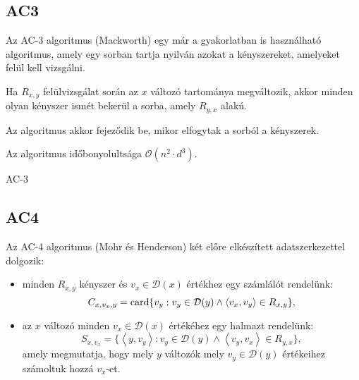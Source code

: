 \subsection{AC3}

Az AC-3 algoritmus (Mackworth) egy már a gyakorlatban is használható
algoritmus, amely egy sorban tartja nyilván azokat a kényszereket, amelyeket
felül kell vizsgálni.

Ha $R_{x,y}$ felülvizsgálat során az  $x$ változó tartománya megváltozik, akkor
minden olyan kényszer ismét bekerül a sorba, amely $R_{y,x}$ alakú.

Az algoritmus akkor fejeződik be, mikor elfogytak a sorból a kényszerek.

Az algoritmus időbonyolultsága $\mathcal{O}(n^2 \cdot d^3)$.

\begin{algorithm}[H]
    \DontPrintSemicolon
    {
        \;
    }
    \caption{AC-3}
\end{algorithm}

\subsection{AC4}

Az AC-4 algoritmus (Mohr és Henderson) két előre elkészített
adatszerkezettel dolgozik:

\begin{itemize}
    \item minden $R_{x,y}$ kényszer és $v_x \in  \mathcal{D}(x)$ értékhez egy
         számlálót rendelünk: \[
             C_{x,v_x,y} =
             \operatorname{card} \{v_y : v_y \in \mathcal{D}(y) \land \langle v_x, v_y \rangle \in R_{x,y}\}
         ,\]
     \item az $x$ változó minden $v_x \in \mathcal{D}(x)$ értékéhez egy halmazt
         rendelünk: \[
            S_{x,v_x} = \{
                \left<y, v_y \right> :
                v_y \in \mathcal{D}(y) \land
                \left<v_y, v_x \right> \in R_{y,x}
            \}
        ,\]
        amely megmutatja, hogy mely $y$ változók mely $v_y \in \mathcal{D}(y)$ értékeihez
        számoltuk hozzá $v_x$-et.
\end{itemize}

